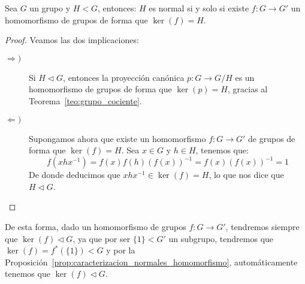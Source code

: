 \begin{prop}\label{prop:caracterizacion_normales_homomorfismo}
    Sea $G$ un grupo y $H<G$, entonces: $H$ es normal si y solo si existe $f:G\to G'$ un homomorfismo de grupos de forma que $\ker(f) = H$.
    \begin{proof}
        Veamos las dos implicaciones:
        \begin{description}
            \item [$\Longrightarrow)$] Si $H\lhd G$, entonces la proyección canónica $p:G\to G/H$ es un homomorfismo de grupos de forma que $\ker(p) = H$, gracias al Teorema~\ref{teo:grupo_cociente}.
            \item [$\Longleftarrow)$] Supongamos ahora que existe un homomorfismo $f:G\to G'$ de grupos de forma que $\ker(f) = H$. Sea $x\in G$ y $h\in H$, tenemos que:
                \begin{equation*}
                    f(xhx^{-1}) = f(x)f(h){(f(x))}^{-1} = f(x) {(f(x))}^{-1} = 1
                \end{equation*}
                De donde deducimos que $xhx^{-1}\in \ker(f) = H$, lo que nos dice que $H\lhd G$.
        \end{description}
    \end{proof}
\end{prop}
\begin{observacion}
    De esta forma, dado un homomorfismo de grupos $f:G\to G'$, tendremos siempre que $\ker(f) \lhd G$, ya que por ser $\{1\}<G'$ un subgrupo, tendremos que $\ker(f)=f^\ast(\{1\}) < G$ y por la Proposición~\ref{prop:caracterizacion_normales_homomorfismo}, automáticamente tenemos que $\ker(f) \lhd G$.
\end{observacion}


